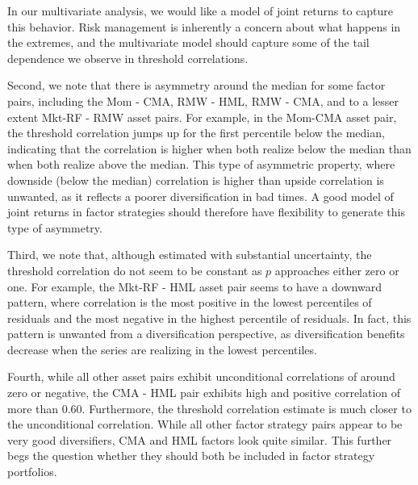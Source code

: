In our multivariate analysis, we would like a model of joint returns to capture this behavior. Risk management is inherently a concern about what happens in the extremes, and the multivariate model should capture some of the tail dependence we observe in threshold correlations.

Second, we note that there is asymmetry around the median for some factor pairs, including the Mom - CMA, RMW - HML, RMW - CMA, and to a lesser extent Mkt-RF - RMW asset pairs. For example, in the Mom-CMA asset pair, the threshold correlation jumps up for the first percentile below the median, indicating that the correlation is higher when both realize below the median than when both realize above the median. This type of asymmetric property, where downside (below the median) correlation is higher than upside correlation is unwanted, as it reflects a poorer diversification in bad times. A good model of joint returns in factor strategies should therefore have flexibility to generate this type of asymmetry.

Third, we note that, although estimated with substantial uncertainty, the threshold correlation do not seem to be constant as $p$ approaches either zero or one. For example, the Mkt-RF - HML asset pair seems to have a downward pattern, where correlation is the most positive in the lowest percentiles of residuals and the most negative in the highest percentile of residuals. In fact, this pattern is unwanted from a diversification perspective, as diversification benefits decrease when the series are realizing in the lowest percentiles.

Fourth, while all other asset pairs exhibit unconditional correlations of around zero or negative, the CMA - HML pair exhibits high and positive correlation of more than 0.60. Furthermore, the threshold correlation estimate is much closer to the unconditional correlation. While all other factor strategy pairs appear to be very good diversifiers, CMA and HML factors look quite similar. This further begs the question whether they should both be included in factor strategy portfolios.

